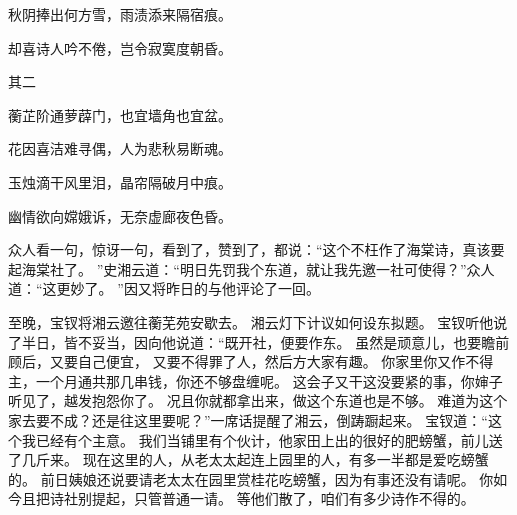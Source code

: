 \par
秋阴捧出何方雪，雨渍添来隔宿痕。
\par
却喜诗人吟不倦，岂令寂寞度朝昏。
\par
\hop
其二\par
蘅芷阶通萝薜门，也宜墙角也宜盆。
\par
花因喜洁难寻偶，人为悲秋易断魂。
\par
玉烛滴干风里泪，晶帘隔破月中痕。
\par
幽情欲向嫦娥诉，无奈虚廊夜色昏。
\par
\hop
众人看一句，惊讶一句，看到了，赞到了，都说：“这个不枉作了海棠诗，真该要起海棠社了。
”史湘云道：“明日先罚我个东道，就让我先邀一社可使得？”众人道：“这更妙了。
”因又将昨日的与他评论了一回。
\par
至晚，宝钗将湘云邀往蘅芜苑安歇去。
湘云灯下计议如何设东拟题。
宝钗听他说了半日，皆不妥当，因向他说道：“既开社，便要作东。
虽然是顽意儿，也要瞻前顾后，又要自己便宜，
又要不得罪了人，然后方大家有趣。
你家里你又作不得主，一个月通共那几串钱，你还不够盘缠呢。
这会子又干这没要紧的事，你婶子听见了，越发抱怨你了。
况且你就都拿出来，做这个东道也是不够。
难道为这个家去要不成？还是往这里要呢？”一席话提醒了湘云，倒踌蹰起来。
宝钗道：“这个我已经有个主意。
我们当铺里有个伙计，他家田上出的很好的肥螃蟹，前儿送了几斤来。
现在这里的人，从老太太起连上园里的人，有多一半都是爱吃螃蟹的。
前日姨娘还说要请老太太在园里赏桂花吃螃蟹，因为有事还没有请呢。
你如今且把诗社别提起，只管普通一请。
等他们散了，咱们有多少诗作不得的。
